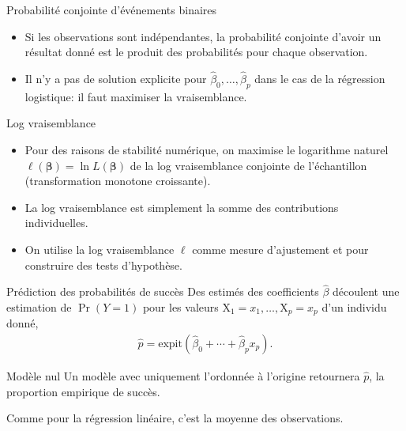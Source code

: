 \documentclass[
  ignorenonframetext,
]{beamer}
\providecommand{\tightlist}{%
  \setlength{\itemsep}{0pt}\setlength{\parskip}{0pt}}\usepackage{longtable,booktabs,array}
\begin{document}
\begin{frame}{Probabilité conjointe d'événements binaires}
\protect\hypertarget{probabilituxe9-conjointe-duxe9vuxe9nements-binaires}{}
\begin{itemize}
\tightlist
\item
  Si les observations sont indépendantes, la probabilité conjointe
  d'avoir un résultat donné est le produit des probabilités pour chaque
  observation.
\item
  Il n'y a pas de solution explicite pour
  \(\widehat{\beta}_0, \ldots, \widehat{\beta}_p\) dans le cas de la
  régression logistique: il faut maximiser la vraisemblance.
\end{itemize}
\end{frame}

\begin{frame}{Log vraisemblance}
\protect\hypertarget{log-vraisemblance}{}
\begin{itemize}
\tightlist
\item
  Pour des raisons de stabilité numérique, on maximise le logarithme
  naturel \(\ell(\boldsymbol{\beta}) = \ln L(\boldsymbol{\beta})\) de la
  log vraisemblance conjointe de l'échantillon (transformation monotone
  croissante).
\item
  La log vraisemblance est simplement la somme des contributions
  individuelles.
\item
  On utilise la log vraisemblance \(\ell\) comme mesure d'ajustement et
  pour construire des tests d'hypothèse.
\end{itemize}
\end{frame}

\begin{frame}{Prédiction des probabilités de succès}
\protect\hypertarget{pruxe9diction-des-probabilituxe9s-de-succuxe8s}{}
Des estimés des coefficients \(\widehat{\beta}\) découlent une
estimation de \(\Pr(Y=1)\) pour les valeurs
\(\mathrm{X}_1=x_1, \ldots, \mathrm{X}_p=x_p\) d'un individu donné,
\begin{align*}
 \widehat{p} = \textrm{expit}(\widehat{\beta}_0 + \cdots + \widehat{\beta}_px_p).
\end{align*}
\end{frame}

\begin{frame}{Modèle nul}
\protect\hypertarget{moduxe8le-nul}{}
Un modèle avec uniquement l'ordonnée à l'origine retournera
\(\widehat{p}\), la proportion empirique de succès.

Comme pour la régression linéaire, c'est la moyenne des observations.
\end{frame}
\end{document}
